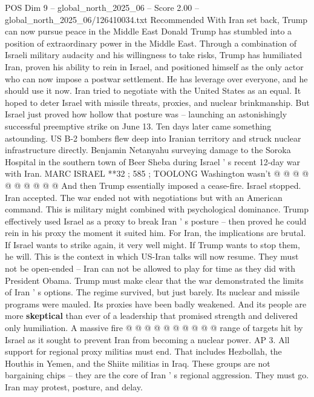 \begin{textsample}{POS Dim 9 – global\_north\_2025\_06 – Score 2.00 – global\_north\_2025\_06/126410034.txt}  \label{ex:f9_pos_347}
Recommended With Iran set back, Trump can now pursue peace in the Middle East Donald Trump has stumbled into a position of extraordinary power in the Middle East.
Through a combination of Israeli military audacity and his willingness to take risks, Trump has humiliated Iran, proven his ability to rein in Israel, and positioned himself as the only actor who can now impose a postwar settlement.
He has leverage over everyone, and he should use it now.
Iran tried to negotiate with the United States as an equal.
It hoped to deter Israel with missile threats, proxies, and nuclear brinkmanship.
But Israel just proved how hollow that posture was -- launching an astonishingly successful preemptive strike on June 13.
Ten days later came something astounding.
US B-2 bombers flew deep into Iranian territory and struck nuclear infrastructure directly.
Benjamin Netanyahu surveying damage to the Soroka Hospital in the southern town of Beer Sheba during Israel ' s recent 12-day war with Iran.
MARC ISRAEL **32 ; 585 ; TOOLONG Washington wasn't @ @ @ @ @ @ @ @ @ @ And then Trump essentially imposed a cease-fire.
Israel stopped.
Iran accepted.
The war ended not with negotiations but with an American command.
This is military might combined with psychological dominance.
Trump effectively used Israel as a proxy to break Iran ' s posture -- then proved he could rein in his proxy the moment it suited him.
For Iran, the implications are brutal.
If Israel wants to strike again, it very well might.
If Trump wants to stop them, he will.
This is the context in which US-Iran talks will now resume.
They must not be open-ended -- Iran can not be allowed to play for time as they did with President Obama.
Trump must make clear that the war demonstrated the limits of Iran ' s options.
The regime survived, but just barely.
Its nuclear and missile programs were mauled.
Its proxies have been badly weakened.
And its people are more \textbf{skeptical} than ever of a leadership that promised strength and delivered only humiliation.
A massive fire @ @ @ @ @ @ @ @ @ @ range of targets hit by Israel as it sought to prevent Iran from becoming a nuclear power.
AP 3.
All support for regional proxy militias must end.
That includes Hezbollah, the Houthis in Yemen, and the Shiite militias in Iraq.
These groups are not bargaining chips -- they are the core of Iran ' s regional aggression.
They must go.
Iran may protest, posture, and delay.

\end{textsample}

